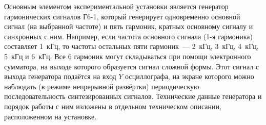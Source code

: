 \experiment
Основным элементом экспериментальной установки является генератор гармонических сигналов Г6-1, который генерирует
одновременно основной сигнал (на выбранной частоте) и пять гармоник, кратных основному сигналу и синхронных с ним.
Например, если частота основного сигнала (1-я гармоника) составляет 1~кГц, то частоты остальных пяти гармоник~--- 2~кГц,
3~кГц, 4~кГц, 5~кГц и 6~кГц. Все 6 гармоник могут складываться при помощи электронного сумматора, на выходе которого
образуется сигнал сложной формы. Этот сигнал с выхода генератора подаётся на вход $Y$ осциллографа, на экране которого
можно наблюдать (в режиме непрерывной развёртки) периодическую последовательность синтезированных сигналов. Технические
данные генератора и порядок работы с ним изложены в отдельном техническом описании, расположенном на установке.

